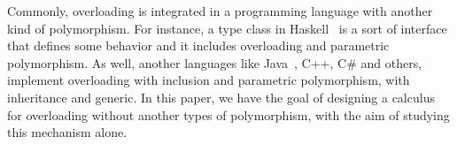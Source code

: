 \documentclass{article}
\begin{document}
\begin{comment}
We may imagine that a preprocessing of the program will eliminate overloading by giving different names to the different functions; in this sense overloading is just a convenient syntactic abbreviation.
 Overloading is not true polymorphism: instead of a value having many types, we allow a symbol to have many types, but the values denoted by that symbol have distinct and possibly incompatible types. Similarly, coercions do not achieve true polymorphism: an operator may appear to accept values of many types, but the values must be converted to some representation before the operator can use them; hence that operator really works on (has) only one type. Moreover, the output type is no longer dependent on the input type, as is the case in parametric polymorphism.
\end{comment}

Commonly, overloading is integrated in a programming language with another kind of polymorphism. For instance, a type class in Haskell~\cite{Nipkow:1993:TCT:158511.158698, Odersky:1995:SLO:224164.224195, Ribeiro2013, wadlerBlott:popl89} is a sort of interface that defines some behavior and it includes overloading and parametric polymorphism. As well, another languages like Java~\cite{BETTINI2009261}, C++, C\# and others, implement overloading with inclusion and parametric polymorphism, with inheritance and generic. In this paper, we have the goal of designing a calculus for overloading without another types of polymorphism, with the aim of studying this mechanism alone.
\end{document}
